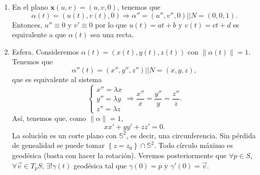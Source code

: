 \begin{eg}
\begin{enumerate}
\item En el plano $\displaystyle \textbf{x} \left(u,v\right)=\left(u,v,0\right) $, tenemos que 
	\[\alpha\left(t\right)=\left(u\left(t\right), v\left(t\right), 0\right) \Rightarrow \alpha'' = \left(u'', v'', 0\right) | | N = \left(0,0,1\right) .\]
	Entonces, $\displaystyle u'' \equiv 0 $ y $\displaystyle v' \equiv 0 $ por lo que $\displaystyle u\left(t\right)=at + b $ y $\displaystyle v\left(t\right)=ct + d $ es equivalente a que $\displaystyle \alpha\left(t\right) $ sea una recta.
\item Esfera. Consideremos $\displaystyle \alpha\left(t\right)=\left(x\left(t\right), y\left(t\right), z\left(t\right)\right) $ con $\displaystyle \|\alpha\left(t\right)\| = 1 $. Tenemos que 
	\[\alpha''\left(t\right)=\left(x'', y'', z''\right) | | N = \left(x,y,z\right) ,\]
	que es equivalente al sistema 
	\[
	\begin{cases}
	x'' = \lambda x \\
	y'' = \lambda y\\
	z'' = \lambda z
	\end{cases}
	\Rightarrow \frac{x''}{x}= \frac{y''}{y} = \frac{z''}{z}.\]
Así, tenemos que, como $\displaystyle \|\alpha\| = 1 $, 
\[x x' + y y' + z z' = 0 .\]
La solución es un corte plano con $\displaystyle \mathbb{S}^{2} $, es decir, una circunferencia. Sin pérdida de genealidad se puede tomar $\displaystyle \left\{ z = z_{0}\right\} \cap \mathbb{S}^{2} $. 
Todo círculo máximo es geodésica (basta con hacer la rotación). Veremos posteriormente que $\displaystyle \forall p \in S $, $\displaystyle \forall \vec{v}\in T_{p}S $, $\displaystyle \exists !\gamma\left(t\right) $ geodésica tal que $\displaystyle \gamma\left(0\right)=p $ y $\displaystyle \gamma'\left(0\right)=\vec{v} $. 
\end{enumerate}
\end{eg}

